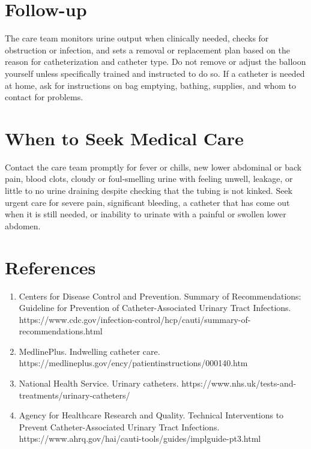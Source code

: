 \section*{Follow-up}
The care team monitors urine output when clinically needed, checks for obstruction or infection, and sets a removal or replacement plan based on the reason for catheterization and catheter type. Do not remove or adjust the balloon yourself unless specifically trained and instructed to do so. If a catheter is needed at home, ask for instructions on bag emptying, bathing, supplies, and whom to contact for problems.

\section*{When to Seek Medical Care}
Contact the care team promptly for fever or chills, new lower abdominal or back pain, blood clots, cloudy or foul-smelling urine with feeling unwell, leakage, or little to no urine draining despite checking that the tubing is not kinked. Seek urgent care for severe pain, significant bleeding, a catheter that has come out when it is still needed, or inability to urinate with a painful or swollen lower abdomen.

\section*{References}
\begin{enumerate}
  \item Centers for Disease Control and Prevention. Summary of Recommendations: Guideline for Prevention of Catheter-Associated Urinary Tract Infections. https://www.cdc.gov/infection-control/hcp/cauti/summary-of-recommendations.html
  \item MedlinePlus. Indwelling catheter care. https://medlineplus.gov/ency/patientinstructions/000140.htm
  \item National Health Service. Urinary catheters. https://www.nhs.uk/tests-and-treatments/urinary-catheters/
  \item Agency for Healthcare Research and Quality. Technical Interventions to Prevent Catheter-Associated Urinary Tract Infections. https://www.ahrq.gov/hai/cauti-tools/guides/implguide-pt3.html
\end{enumerate}

\clearpage

